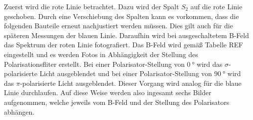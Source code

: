 Zuerst wird die rote Linie betrachtet. Dazu wird der Spalt $S_2$ auf die rote Linie geschoben. Durch eine Verschiebung des Spalten kann es vorkommen, dass die folgenden Bauteile erneut nachjustiert werden müssen. Dies gilt auch für die späteren Messungen der blauen Linie.
Daraufhin wird bei ausgeschaltetem B-Feld das Spektrum der roten Linie fotografiert. Das B-Feld wird gemäß Tabelle REF eingestellt und es werden Fotos in Abhängigkeit der Stellung des Polarisationsfliter erstellt. Bei einer Polarisator-Stellung von $\SI{0}{\degree}$ wird das $\sigma$-polarisierte Licht ausgeblendet und bei einer Polarisator-Stellung von $\SI{90}{\degree}$ wird das $\pi$-polarisierte Licht ausgeblendet.
Dieser Vorgang wird analog für die blaue Linie durchlaufen. Auf diese Weise werden also ingesamt sechs Bilder aufgenommen, welche jeweils vom B-Feld und der Stellung des Polarisators abhängen.

